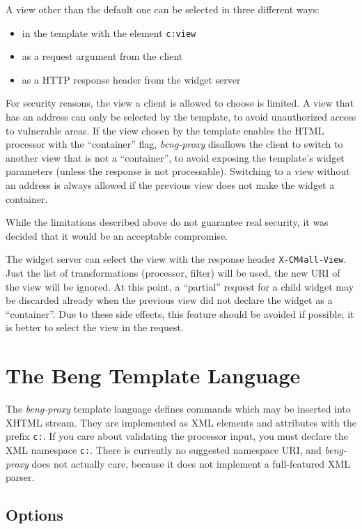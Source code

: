 \documentclass[a4paper,12pt]{article}
\begin{document}
A view other than the default one can be selected in three different
ways:

\begin{itemize}
\item in the template with the element \texttt{c:view}
\item as a request argument from the client
\item as a HTTP response header from the widget server
\end{itemize}

For security reasons, the view a client is allowed to choose is
limited.  A view that has an address can only be selected by the
template, to avoid unauthorized access to vulnerable areas.  If the
view chosen by the template enables the HTML processor with the
``container'' flag, \emph{beng-proxy} disallows the client to switch
to another view that is not a ``container'', to avoid exposing the
template's widget parameters (unless the response is not processable).
Switching to a view without an address is always allowed if the
previous view does not make the widget a container.

While the limitations described above do not guarantee real
security, it was decided that it would be an acceptable compromise.

The widget server can select the view with the response header
\texttt{X-CM4all-View}.  Just the list of transformations (processor,
filter) will be used, the new URI of the view will be ignored.  At
this point, a ``partial'' request for a child widget may be discarded
already when the previous view did not declare the widget as a
``container''.  Due to these side effects, this feature should be
avoided if possible; it is better to select the view in the request.

\section{The Beng Template Language}
\label{processor}

The \emph{beng-proxy} template language defines commands which may be
inserted into XHTML stream.  They are implemented as XML elements and
attributes with the prefix \texttt{c:}.  If you care about validating
the processor input, you must declare the XML namespace \texttt{c:}.
There is currently no suggested namespace URI, and \emph{beng-proxy}
does not actually care, because it does not implement a full-featured
XML parser.

\subsection{Options}
\end{document}
